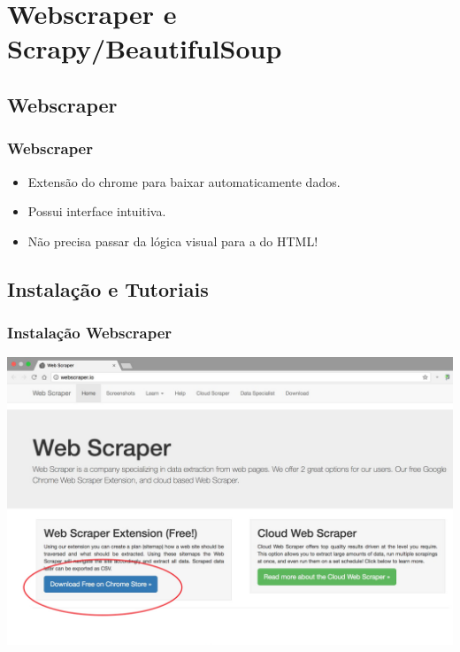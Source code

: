 \documentclass{beamer}
\begin{document}
\section{Webscraper e Scrapy/BeautifulSoup}

\subsection{Webscraper} %
\begin{frame}
\frametitle{Webscraper}
\begin{itemize}
\item Extensão do chrome para baixar automaticamente dados.\\
\item Possui interface intuitiva.\\
\item Não precisa passar da lógica visual para a do HTML!\\
\end{itemize}
\end{frame}

\subsection{Instalação e Tutoriais} %


\begin{frame}
\frametitle{Instalação Webscraper}
\includegraphics[width=\textwidth]{WhatsApp_Image_2017-10-05_at_17_22_43.jpg}
\end{frame}
\end{document}
